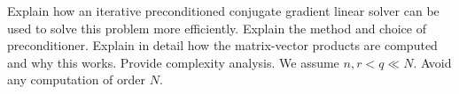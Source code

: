 Explain how an iterative preconditioned conjugate gradient linear solver can be used to solve this problem more efficiently. Explain the method and choice of preconditioner. Explain in detail how the matrix-vector products are computed and why this works. Provide complexity analysis. We assume $n, r < q \ll N$. Avoid any computation of order $N$.


